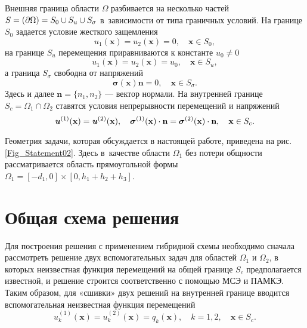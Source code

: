 \documentclass[press]{vestnik}
\begin{document}
Внешняя граница области $\Omega$ разбивается на несколько частей $S \dm =  (\partial \Omega) = S_{0} \cup S_{u} \cup S_{\sigma}$ в~зависимости от типа граничных условий. На границе $S_{0}$ задается условие жесткого защемления
\begin{equation} \label{S_0}
	u_{1}({\bm{x}})=u_{2}({\bm{x}})=0, \quad {\bm{x}} \in S_{0},
\end{equation}
на границе $S_{u}$ перемещения приравниваются к константе $u_0 \neq 0$
\begin{equation} \label{S_u}
	u_{1}({\bm{x}})=u_{2}({\bm{x}}) = u_0, \quad {\bm{x}} \in S_{u},
\end{equation}
а граница $S_{\sigma}$ свободна от напряжений
\begin{equation} \label{S_sigm}
	\bm{\sigma}(\bm{x}) \bm{n} = 0, \quad {\bm{x}} \in S_{\sigma}.
\end{equation}
Здесь и далее $\bm{n}=\{n_{1}^{},n_{2}^{}\}$ --- вектор нормали. На внутренней границе $S_{c} = \Omega_1 \cap \Omega_2$ ставятся условия непрерывности перемещений и напряжений
\begin{equation} \label{Sc}
	\textbf{\textit{u}}^{(1)}(\bm{x}) = \textbf{\textit{u}}^{(2)}(\bm{x}), \quad  \bm{\sigma}^{(1)}(\bm{x}) \cdot \bm{n} = \bm{\sigma}^{(2)}(\bm{x}) \cdot \bm{n}, \quad {\bm{x}} \in S_{c}.
\end{equation}



Геометрия задачи, которая обсуждается в настоящей работе, приведена на рис. \ref{Fig_Statement02}. Здесь в~качестве области $\Omega_{1}$ без потери общности рассматривается область прямоугольной формы $\Omega_{1} = [-d_{1},0] \times [0,h_{1}+h_{2}+h_{3}]$.



\section{Общая схема решения}
Для построения решения с применением гибридной схемы необходимо сначала рассмотреть решение двух вспомогательных задач для областей $\Omega_{1}$ и $\Omega_{2}$, в которых неизвестная функция перемещений на общей границе $S_{c}$ предполагается известной, и решение строится соответственно с помощью МСЭ и ПАМКЭ. Таким образом, для «сшивки» двух решений на внутренней границе вводится вспомогательная неизвестная функция перемещений
\begin{equation} \label{Sq}
	u_{k}^{(1)}({\bm{x}}) = u_{k}^{(2)}({\bm{x}}) = q_{k}({\bm{x}}), \quad k=1, 2, \quad {\bm{x}} \in S_{c}.
\end{equation}
\end{document}
